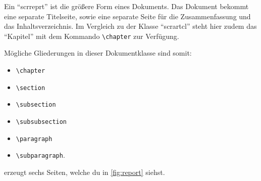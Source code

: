 Ein \enquote{scrreprt} ist die größere Form eines Dokuments. Das Dokument bekommt eine separate Titelseite, sowie eine separate Seite für die Zusammenfassung und das Inhaltsverzeichnis. Im Vergleich zu der Klasse \enquote{scrartcl} steht hier zudem das \enquote{Kapitel} mit dem Kommando \texttt{\textbackslash chapter} zur Verfügung.

Mögliche Gliederungen in dieser Dokumentklasse sind somit:

\begin{itemize}
	\item \texttt{\textbackslash chapter}
	\item \texttt{\textbackslash section}
	\item \texttt{\textbackslash subsection}
	\item \texttt{\textbackslash subsubsection}
	\item \texttt{\textbackslash paragraph}
	\item \texttt{\textbackslash subparagraph}.
\end{itemize}

 erzeugt sechs Seiten, welche du in \cref{fig:report} siehst.

